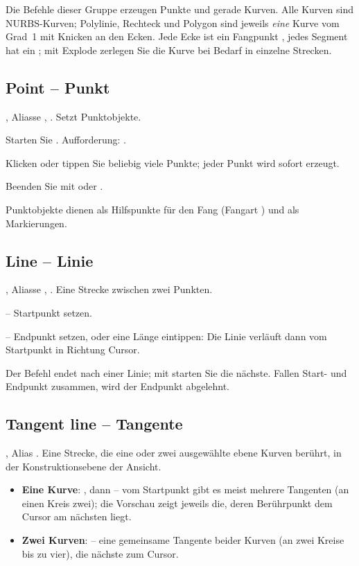 Die Befehle dieser Gruppe erzeugen Punkte und gerade Kurven. Alle Kurven sind NURBS-Kurven;
Polylinie, Rechteck und Polygon sind jeweils \emph{eine} Kurve vom Grad~1 mit Knicken an den
Ecken. Jede Ecke ist ein Fangpunkt , jedes Segment hat ein ; mit Explode
zerlegen Sie die Kurve bei Bedarf in einzelne Strecken.

\subsection{Point -- Punkt}\label{sec:cmd-point}
, Aliasse , . Setzt Punktobjekte.
\begin{schritte}
\item Starten Sie . Aufforderung: .
\item Klicken oder tippen Sie beliebig viele Punkte; jeder Punkt wird sofort erzeugt.
\item Beenden Sie mit  oder .
\end{schritte}
Punktobjekte dienen als Hilfspunkte für den Fang (Fangart ) und als Markierungen.

\subsection{Line -- Linie}\label{sec:cmd-line}
, Aliasse , . Eine Strecke zwischen zwei Punkten.
\begin{schritte}
\item {} -- Startpunkt setzen.
\item {} -- Endpunkt setzen, oder eine Länge eintippen: Die
  Linie verläuft dann vom Startpunkt in Richtung Cursor.
\end{schritte}
Der Befehl endet nach einer Linie; mit  starten Sie die nächste. Fallen Start- und
Endpunkt zusammen, wird der Endpunkt abgelehnt.

\subsection{Tangent line -- Tangente}\label{sec:cmd-tangent}
, Alias . Eine Strecke, die eine oder zwei ausgewählte ebene Kurven
berührt, in der Konstruktionsebene der Ansicht.
\begin{itemize}
\item \textbf{Eine Kurve}: , dann  -- vom Startpunkt gibt es meist mehrere Tangenten (an einen Kreis
  zwei); die Vorschau zeigt jeweils die, deren Berührpunkt dem Cursor am nächsten liegt.
\item \textbf{Zwei Kurven}:  -- eine gemeinsame
  Tangente beider Kurven (an zwei Kreise bis zu vier), die nächste zum Cursor.
\end{itemize}

